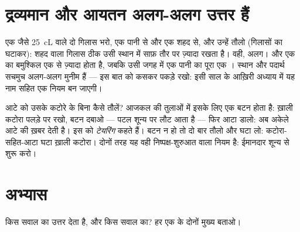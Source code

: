 \section{द्रव्यमान और आयतन अलग-अलग उत्तर हैं}

\begin{example}\label{ex:g6:mass-and-volume:different}
एक जैसे \qty{25}{cL} वाले दो गिलास भरो, एक पानी से और एक शहद से, और
उन्हें तौलो (गिलासों का  घटाकर): शहद वाला गिलास ठीक उसी स्थान में
साफ़ तौर पर ज़्यादा  रखता है।  वही,  अलग। और एक 
 का  बमुश्किल एक  से ज़्यादा होता है, जबकि उसी जगह में एक
 पानी का  पूरा एक । स्थान और पदार्थ सचमुच अलग-अलग
मुनीम हैं --- इस बात को कसकर पकड़े रखो: इसी साल के आख़िरी अध्याय में यह
नाम सहित एक नियम बन जाएगी।
\end{example}

\begin{remark}[उसे तौलना जो अकेला खड़ा नहीं हो सकता]\label{rem:g6:mass-and-volume:tare}
आटे को उसके कटोरे के बिना कैसे तौलें? आजकल की तुलाओं में इसके लिए एक
बटन होता है: ख़ाली कटोरा पलड़े पर रखो, बटन दबाओ --- पटल शून्य पर लौट
आता है --- फिर आटा डालो: अब  अकेले आटे की ख़बर देती है। इस  को
\emph{टेयरिंग} कहते हैं। बटन न हो तो दो बार तौलो और घटा लो:
कटोरा-सहित-आटा घटा ख़ाली कटोरा। दोनों तरह यह वही निष्पक्ष-शुरुआत वाला
नियम है: ईमानदार शून्य से शुरू करो।
\end{remark}

\section{अभ्यास}

\begin{exercise}[$\star$]\label{exo:g6:mass-and-volume:1}
 किस सवाल का उत्तर देता है, और  किस सवाल का? हर एक के
दोनों मुख्य  बताओ।
\end{exercise}

